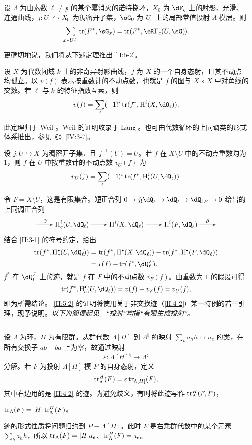 \begin{lemma_}\label{II:5-2}
设 $\Lambda$ 为由素数 $\ell\ne p$ 的某个幂消灭的诺特挠环，$X_0$ 为 $\dF_q$ 上的射影、光滑、连通曲线，$j:U_0\hookrightarrow X_0$ 为稠密开子集，$\sG_0$ 为 $U_0$ 上的局部常值投射 $\Lambda$-模层。则
\[\sum_{x\in U^F}\tr(F^*,\sG_x)=\tr(F^*,\eR\Gamma_c(U,\sG)).\]
\end{lemma_}
更确切地说，我们将从下述定理推出 \ref{II:5-2}。
\begin{theorem_}\label{II:5-3}
设 $X$ 为代数闭域 $k$ 上的非奇异射影曲线，$f$ 为 $X$ 的一个自身态射，且其不动点均孤立。以 $v(f)$ 表示按重数计的不动点数，也就是 $f$ 的图与 $X\times X$ 中对角线的交数。若 $\ell$ 与 $k$ 的特征指数互素，则
\[v(f)=\sum_i(-1)^i\tr(f^*,\h^i(X,\dQ_\ell)).\]
\end{theorem_}
此定理归于 Weil \cite[第43、66、68条]{we48}。Weil 的证明收录于 Lang \cite[VI \S3 与 VII \S2 定理3]{la83}。也可由代数循环的上同调类的形式体系推出，参见《》\ref{IV:3-7}。

\begin{corollary_}\label{II:5-4}
设 $j:U\hookrightarrow X$ 为稠密开子集，且 $f^{-1}(U)=U$。若 $f$ 在 $X\setminus U$ 中的不动点重数均为 $1$，则 $f$ 在 $U$ 中按重数计的不动点数 $v_U(f)$ 为
\[v_U(f)=\sum_i(-1)^i\tr(f^*,\h_c^i(U,\dQ_\ell)).\]
\end{corollary_}
令 $F=X\setminus U$，这是有限集合。短正合列 $0\to j_!\dQ_\ell\to\dQ_\ell\to{\dQ_\ell}_F\to0$ 给出的上同调正合列
\[\xymatrix{\ar[r]^-\partial&\h_c^i(U,\dQ_\ell)\ar[r]&\h^i(X,\dQ_\ell)\ar[r]&\h^i(F,\dQ_\ell)\ar[r]^-\partial&}\]
结合 \ref{II:3-1} 的符号约定，给出
\begin{align*}
\tr(f^*,\h_c^\bullet(U,\dQ_\ell))&=\tr(f^*,\h^\bullet(X,\dQ_\ell))-\tr(f^*,\h^\bullet(F,\dQ_\ell))\\
&=v(f)-\tr(f^*,\dQ_\ell^F).
\end{align*}
$f^*$ 在 $\dQ_\ell^F$ 上的迹，就是 $f$ 在 $F$ 中的不动点数 $v_F(f)$。由重数为 $1$ 的假设可得
\[\tr(f^*,\h_c^\bullet(U,\dQ_\ell))=v(f)-v_F(f)=v_U(f),\]
即为所需结论。
\ref{II:5-2} 的证明将使用关于非交换迹（\ref{II:4-2}）某一特例的若干引理，现予说明。\emph{以下为简便起见，“投射”均指“有限生成投射”。}

\subsection{}\label{II:5-5}
设 $\Lambda$ 为环，$H$ 为有限群。从群代数 $\Lambda[H]$ 到 $\Lambda^\natural$ 的映射 $\sum_ha_hh\mapsto a_e$ 的类，在所有交换子 $ab-ba$ 上为零，故通过映射
\[\varepsilon:\Lambda[H]^\natural\to\Lambda^\natural\]
分解。若 $F$ 为投射 $\Lambda[H]$-模 $P$ 的自身态射，定义
\[\operatorname{tr}_\Lambda^H(F)=\varepsilon\operatorname{tr}_{\Lambda[H]}(F),\]
其中右边用的是 \ref{II:4-2} 的迹。为避免歧义，有时将此迹写作 $\operatorname{tr}_\Lambda^H(F,P)$。
\begin{proposition_}\label{II:5-6}
$\operatorname{tr}_\Lambda(F)=|H|\operatorname{tr}_\Lambda^H(F)$。
\end{proposition_}
迹的形式性质将问题归约到 $P=\Lambda[H]$。此时 $F$ 是右乘群代数中的某个元素 $\sum_ha_hh$，所以 $\operatorname{tr}_\Lambda(F)=|H|a_e$、$\operatorname{tr}_\Lambda^H(F)=a_e$。

